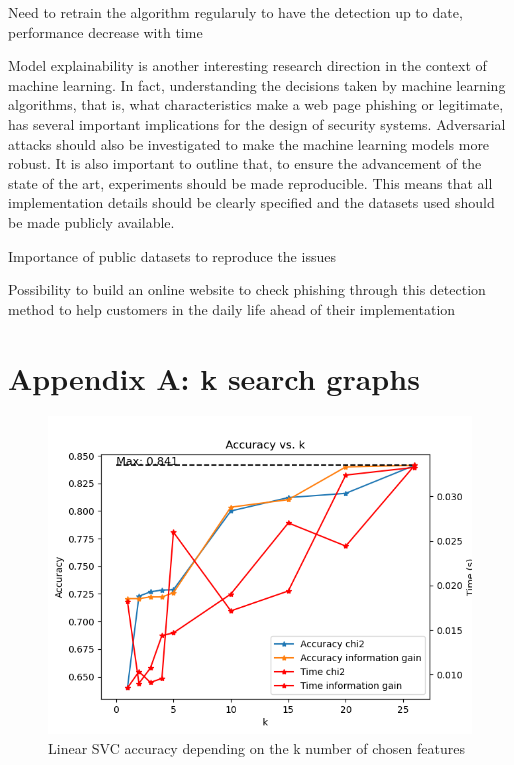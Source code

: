\documentclass{article}
\begin{document}
    Need to retrain the algorithm regularuly to have the detection up to date, performance decrease with time

    Model explainability is another interesting research direction
    in the context of machine learning. In fact, understanding
    the decisions taken by machine learning algorithms, that is,
    what characteristics make a web page phishing or legitimate,
    has several important implications for the design of security
    systems. Adversarial attacks should also be investigated to
    make the machine learning models more robust.
    It is also important to outline that, to ensure the advancement
    of the state of the art, experiments should be made reproducible.
    This means that all implementation details should
    be clearly specified and the datasets used should be made
    publicly available.

    Importance of public datasets to reproduce the issues

    Possibility to build an online website to check phishing through this detection method to help customers in the daily life ahead of their implementation

    
    

    \appendix
    \section{Appendix A: k search graphs}

\begin{figure}
    \centering
    \includegraphics{report_img/k_search/linear_svc}
    \caption{Linear SVC accuracy depending on the k number of chosen features}
    \label{fig:}
\end{figure}
\end{document}
